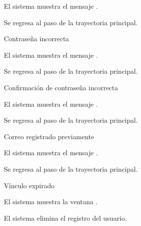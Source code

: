 {\begin{trayectoriaAlternativa}
    \item El sistema muestra el mensaje .

    \item Se regresa al paso  de la trayectoria
      principal.

  \end{trayectoriaAlternativa}

  \begin{trayectoriaAlternativa}
    {Contraseña incorrecta}

    \item El sistema muestra el mensaje
      .

    \item Se regresa al paso  de la trayectoria
      principal.

  \end{trayectoriaAlternativa}

  \begin{trayectoriaAlternativa}
    {Confirmación de contraseña incorrecta}

    \item El sistema muestra el mensaje
      .

    \item Se regresa al paso  de la trayectoria
      principal.

  \end{trayectoriaAlternativa}

  \begin{trayectoriaAlternativa}
    {Correo registrado previamente}

    \item El sistema muestra el mensaje
      .

    \item Se regresa al paso  de la trayectoria
      principal.

  \end{trayectoriaAlternativa}

  \begin{trayectoriaAlternativa}
    {Vínculo expirado}

    \item El sistema muestra la ventana
      .

    \item El sistema elimina el registro del usuario.

  \end{trayectoriaAlternativa}
}

